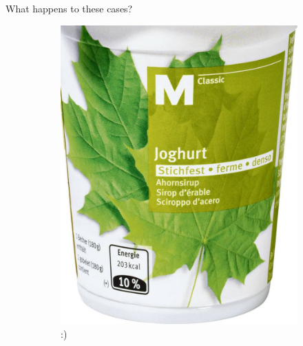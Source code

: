 \documentclass{beamer}
\begin{document}
\begin{frame}{What happens to these cases?}
\begin{figure}[H]
	\centering
	\begin{subfigure}{.32\textwidth}
		\centering
		\includegraphics[width=\textwidth]{m-classic-joghurt-ahornsirup-stichfest-zoom1}
		\pause
		:)
	\end{subfigure}\pause
	\begin{subfigure}{.32\textwidth}
		\centering

\end{subfigure}
\end{figure}
\end{frame}
\end{document}
